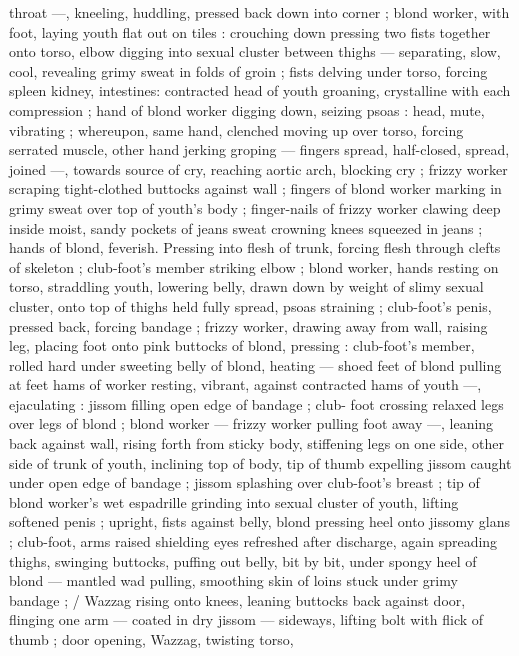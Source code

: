 throat ---, kneeling, huddling, pressed back down into corner ; blond
worker, with foot, laying youth flat out on tiles : crouching down
pressing two fists together onto torso, elbow digging into sexual
cluster between thighs --- separating, slow, cool, revealing grimy
sweat in folds of groin ; fists delving under torso, forcing spleen
kidney, intestines: contracted head of youth groaning, crystalline
with each compression ; hand of blond worker digging down, seizing
psoas : head, mute, vibrating ; whereupon, same hand, clenched
moving up over torso, forcing serrated muscle, other hand jerking
groping --- fingers spread, half-closed, spread, joined ---, towards
source of cry, reaching aortic arch, blocking cry ; frizzy worker
scraping tight-clothed buttocks against wall ; fingers of blond worker
marking in grimy sweat over top of youth's body ; finger-nails of
frizzy worker clawing deep inside moist, sandy pockets of jeans
sweat crowning knees squeezed in jeans ; hands of blond, feverish.
Pressing into flesh of trunk, forcing flesh through clefts of skeleton
; club-foot's member striking elbow ; blond worker, hands resting on
torso, straddling youth, lowering belly, drawn down by weight of
slimy sexual cluster, onto top of thighs held fully spread, psoas
straining ; club-foot's penis, pressed back, forcing bandage ; frizzy
worker, drawing away from wall, raising leg, placing foot onto pink
buttocks of blond, pressing : club-foot's member, rolled hard under
sweeting belly of blond, heating --- shoed feet of blond pulling at
feet hams of worker resting, vibrant, against contracted hams of
youth ---, ejaculating : jissom filling open edge of bandage ; club-
foot crossing relaxed legs over legs of blond ; blond worker --- frizzy
worker pulling foot away ---, leaning back against wall, rising forth
from sticky body, stiffening legs on one side, other side of trunk of
youth, inclining top of body, tip of thumb expelling jissom caught
under open edge of bandage ; jissom splashing over club-foot's
breast ; tip of blond worker's wet espadrille grinding into sexual
cluster of youth, lifting softened penis ; upright, fists against belly,
blond pressing heel onto jissomy glans ; club-foot, arms raised
shielding eyes refreshed after discharge, again spreading thighs,
swinging buttocks, puffing out belly, bit by bit, under spongy heel of
blond --- mantled wad pulling, smoothing skin of loins stuck under
grimy bandage ; / Wazzag rising onto knees, leaning buttocks back
against door, flinging one arm --- coated in dry jissom --- sideways,
lifting bolt with flick of thumb ; door opening, Wazzag, twisting torso,
